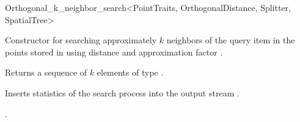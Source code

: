 \begin{ccRefClass}{Orthogonal_k_neighbor_search<PointTraits, OrthogonalDistance, Splitter, SpatialTree>}
\ccOperations

\def\ccLongParamLayout{\ccTrue}
{Constructor for searching approximately $k$ neighbors of the query item  
in the points stored in  using 
distance  and approximation factor .}

{Returns a sequence of $k$ elements of type }.


\begin{ccAdvanced}
{
Inserts statistics of the search process into the output stream .
}
\end{ccAdvanced}

\ccSeeAlso

.

\end{ccRefClass}


